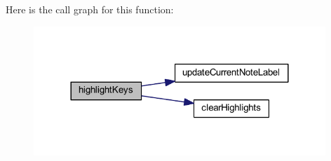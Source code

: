 Here is the call graph for this function\+:\nopagebreak
\begin{figure}[H]
\begin{center}
\leavevmode
\includegraphics[width=312pt]{classcom_1_1lclion_1_1midigui_1_1_dialog_on_screen_keyboard_ae11e61d422e0ffcfde71c2c8d22e8125_cgraph}
\end{center}
\end{figure}


